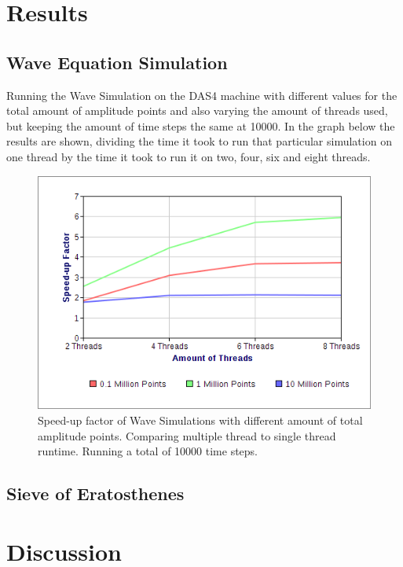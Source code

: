 \documentclass[a4paper,12px]{article}
\begin{document}
\section{Results}
\subsection{Wave Equation Simulation}
Running the Wave Simulation on the DAS4 machine with different values for the
total amount of amplitude points and also varying the amount of threads used,
but keeping the amount of time steps the same at 10000. In the graph below the
results are shown, dividing the time it took to run that particular simulation
on one thread by the time it took to run it on two, four, six and eight threads.

\begin{figure}[H]
    \centering
    \includegraphics[width=\textwidth]{chart1_1}
    \caption{Speed-up factor of Wave Simulations with different amount of total
        amplitude points. Comparing multiple thread to single thread runtime.
        Running a total of 10000 time steps.}
\end{figure}

\subsection{Sieve of Eratosthenes}



\section{Discussion}
\end{document}
